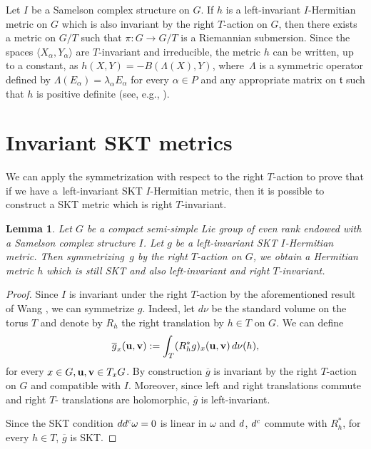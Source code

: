 \documentclass[11pt]{article}
\numberwithin{equation}{section}
\numberwithin{equation}{section}
\newtheorem{Lemma}[Theorem]{Lemma}
\begin{document}
\begin{Remark} \label{remarkAkekseevski} Let $I$ be a Samelson complex structure on $G$. If $h$ is a left-invariant $I$-Hermitian metric on $G$ which is also invariant by the right $T$-action on $G$, then there exists a metric on $G/T$ such that $\pi\colon G\rightarrow G/T$ is a Riemannian submersion. Since the spaces $\langle X_{\alpha}, Y_{\alpha}\rangle$ are $T$-invariant and irreducible,
the metric $h$ can be written, up to a constant, as $h(X,Y)= -B (\Lambda(X),Y)$, where~$\Lambda$ is
a symmetric operator defined by $\Lambda(E_{\alpha})=\lambda_{\alpha} E_{\alpha}$ for every $\alpha \in P$ and any
appropriate matrix on $ \mathfrak t$ such that $h$ is positive definite (see, e.g., \cite{Arv}).
\end{Remark}

\section{Invariant SKT metrics}

 We can apply the symmetrization with respect to the right $T$-action to prove that if we have a~left-invariant SKT $I$-Hermitian metric,
then it is possible to construct a SKT metric which is right $T$-invariant.

\begin{Lemma}\label{llemma1}
Let $G$ be a compact semi-simple Lie group of even rank endowed with a Samelson complex structure $I$. Let $g$ be a left-invariant SKT $I$-Hermitian metric.
Then symmetrizing~$g$ by the right $T$-action on $G$, we obtain a Hermitian metric $h$ which is still SKT and also left-invariant and right $T$-invariant.
\end{Lemma}


\begin{proof} Since $I$ is invariant under the right $T$-action by the aforementioned result of Wang \cite{Wang}, we can symmetrize $g$. Indeed, let $d \nu$ be the standard volume on the torus $T$ and denote by $R_h$ the right translation by $h \in T$ on $G$. We can define
\[
 \overline{g}_x ({\bf u}, {\bf v}) := \int_T (R_h^* g)_x ({\bf u}, {\bf v}) \, {\rm d} \nu (h),
\]
for every $x \in G, {\bf u}, {\bf v} \in T_x G$. By construction $\overline{g}$ is invariant by the right $T$-action on $G$ and compatible with $I$. Moreover, since left and right translations commute and right $T$- translations are holomorphic, $\overline{g}$ is left-invariant.

Since the SKT condition ${\rm d}{\rm d}^{\rm c} \omega= 0$ is linear in $\omega$ and ${\rm d}$, ${\rm d}^{\rm c}$ commute with $R_h^*$, for every $ h \in T$, $\overline{g}$ is SKT. \end{proof}
\end{document}
